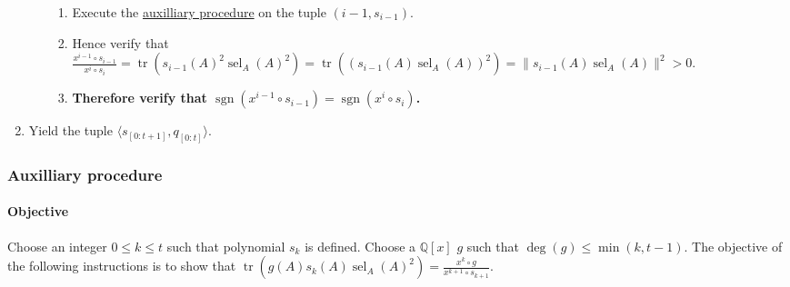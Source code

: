 \documentclass[twocolumn]{article}
\DeclareMathOperator{\sgn}{sgn}
\DeclareMathOperator{\tr}{tr}
\DeclareMathOperator{\sel}{sel}
\begin{document}
\begin{enumerate}
\begin{enumerate}
\begin{enumerate}
							\item Execute the \hyperref[sec:procedure 73 auxilliary procedure]{auxilliary procedure} on the tuple $(i-1, s_{i-1})$.
							\item Hence verify that $\frac{x^{i-1}\circ s_{i-1}}{x^i\circ s_i}=\tr(s_{i-1}(A)^2\sel_A(A)^2)=\tr((s_{i-1}(A)\sel_A(A))^2)=\lVert s_{i-1}(A)\sel_A(A)\rVert^2>0$.
							\item \textbf{Therefore verify that $\sgn(x^{i-1}\circ s_{i-1})=\sgn(x^i\circ s_i)$.}
						\end{enumerate}
					\end{enumerate}
					\item Yield the tuple $\langle s_{[0:t+1]}, q_{[0:t]}\rangle$.
				\end{enumerate}
			\subsubsection*{Auxilliary procedure}\label{sec:procedure 73 auxilliary procedure}
				\paragraph{Objective}
					Choose an integer $0\le k\le t$ such that polynomial $s_k$ is defined. Choose a $\mathbb{Q}[x]$ $g$ such that $\deg(g)\le\min(k,t-1)$. The objective of the following instructions is to show that $\tr(g(A)s_k(A)\sel_A(A)^2)=\frac{x^k\circ g}{x^{k+1}\circ s_{k+1}}$.
\end{document}
